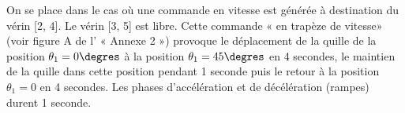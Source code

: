 %


%
%
%



\ifprof
\else
On se place dans le cas où une commande en vitesse est générée à destination du vérin [2, 4]. Le vérin [3, 5]  est libre. Cette commande « en trapèze de vitesse» (voir figure A de l’ « Annexe 2 ») provoque le déplacement de la quille de la position $\theta_1 = 0\degres$ à la position $\theta_1= 45\degres$ en 4 secondes, le maintien de la quille dans cette position pendant 1 seconde puis le retour à la position $\theta_1 = 0$ en 4 secondes. Les phases d’accélération et de décélération (rampes) durent 1 seconde.

